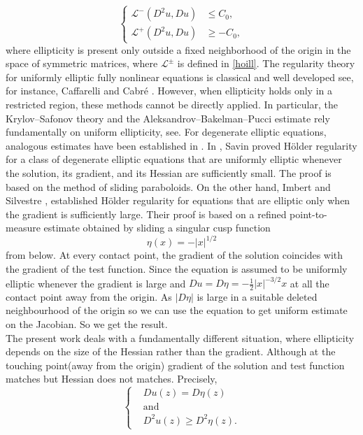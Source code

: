 \documentclass{amsart}
\theoremstyle{plain}
\numberwithin{equation}{section}
\begin{document}
\begin{equation}\label{al3}
\left\{
\begin{aligned}
\mathcal{L}^{-}(D^{2}u,Du)&\leq C_{0},\\
\mathcal{L}^{+}(D^{2}u,Du)&\geq -C_{0},
\end{aligned}
\right.
\end{equation}
where ellipticity is present only outside a fixed neighborhood of the origin in the space of symmetric matrices, where $\mathcal{L}^{\pm}$ is defined in \eqref{hoill}. The regularity theory for uniformly elliptic fully nonlinear equations is classical and well developed see, for instance, Caffarelli and Cabré \cite{caffarelli1995fully}. However, when ellipticity holds only in a restricted region, these methods cannot be directly applied. In particular, the Krylov--Safonov theory and the Aleksandrov--Bakelman--Pucci estimate rely fundamentally on uniform ellipticity, see\cite{krylov1981certain,krylov1983boundedly}.
For degenerate elliptic equations, analogous estimates have been established in \cite{imbert2016estimates,savin2007small}. In \cite{savin2007small}, Savin proved H\"{o}lder regularity for a class of degenerate elliptic equations that are uniformly elliptic whenever the solution, its gradient, and its Hessian are sufficiently small. The proof is based on the method of sliding paraboloids. On the other hand, Imbert and Silvestre \cite{imbert2016estimates}, established H\"{o}lder regularity for equations that are elliptic only when the gradient is sufficiently large. Their proof is based on a refined point-to-measure estimate obtained by sliding a singular cusp function
\[
\eta(x)=-|x|^{1/2}
\]
from below. At every contact point, the gradient of the solution coincides
with the gradient of the test function. Since the equation is assumed to be
uniformly elliptic whenever the gradient is large and $Du=D\eta=-\frac{1}{2}|x|^{-3/2}x$ at all the contact point away from the origin. As $|D\eta|$ is large in a suitable deleted neighbourhood of the origin so we can use the equation to get uniform estimate on the Jacobian. So we get the result.\\
The present work deals with a fundamentally different situation, where
ellipticity depends on the size of the Hessian rather than the gradient.
Although at the touching point(away from the origin) gradient of the solution and test function matches but Hessian does not matches. Precisely,
\begin{equation}\label{nega11}
\left\{
\begin{aligned}
&Du(z)=D\eta(z)\\
&\text{and}\\
&D^{2}u(z)\geq D^{2}\eta(z).
\end{aligned}
\right.
\end{equation}
\end{document}
